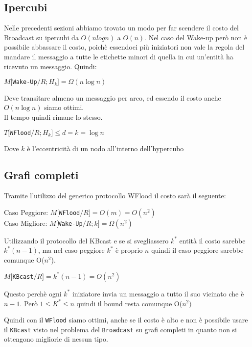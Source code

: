 \subsection{Ipercubi}
Nelle precedenti sezioni abbiamo trovato un modo per far scendere il costo del
Broadcast su ipercubi da $O(nlogn)$ a $O(n)$. Nel caso del Wake-up però non è
possibile abbassare il costo, poichè essendoci più iniziatori non vale la regola
del mandare il messaggio a tutte le etichette minori di quella in cui un'entità
ha ricevuto un messaggio. Quindi:
\begin{center}
    $M[$\texttt{Wake-Up}$/R;H_k] = \Omega(n \log n)$ \\
\end{center}
Deve transitare almeno un messaggio per arco, ed essendo il costo anche $O(n
    \log n)$ siamo ottimi.\\
Il tempo quindi rimane lo stesso.
\begin{center}
    $T[$\texttt{WFlood}$/R;H_k] \leq d = k = \log n$ \\
\end{center}
Dove $k$ è l'eccentricità di un nodo all'interno dell'hypercubo

\subsection{Grafi completi}
Tramite l'utilizzo del generico protocollo WFlood il costo sarà il seguente:
\begin{center}
    Caso Peggiore: $M[$\texttt{WFlood}$/R] = O(m) = O(n^2)$ \\
    Caso Migliore: $M[$\texttt{Wake-Up}$/R;k] = \Omega(n^2)$
\end{center}
Utilizzando il protocollo del KBcast e se si svegliassero $k^*$ entità il costo
sarebbe $k^*(n-1)$, ma nel caso peggiore $k^*$ è proprio $n$ quindi il caso
peggiore sarebbe comunque O($n^2$).
\begin{center}
    $M[$\texttt{KBcast}$/R] = k^*(n-1) = O(n^2)$
\end{center}
Questo perchè ogni $k^*$ iniziatore invia un messaggio a tutto il suo vicinato
che è $n-1$. Però $1\leq K^* \leq n$ quindi il bound resta comunque O($n^2)$

Quindi con il \texttt{WFlood} siamo ottimi, anche se il costo è alto e non è
possibile usare il \texttt{KBcast} visto nel problema del \texttt{Broadcast} su
grafi completi in quanto non si ottengono migliorie di nessun tipo.

